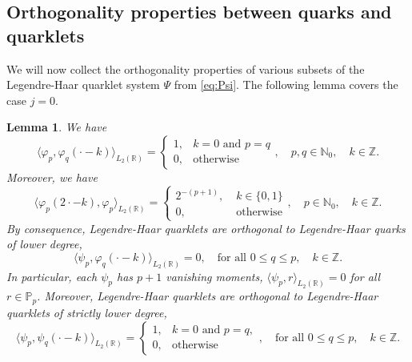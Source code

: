 \documentclass{article}
\newtheorem{lemma}[propo]{Lemma}
\begin{document}
\subsection{Orthogonality properties between quarks and quarklets}
We will now collect the orthogonality properties of various subsets of the Legendre-Haar quarklet system $\Psi$ from \eqref{eq:Psi}. The following lemma covers the case $j=0$.
\begin{lemma}\label{lemma:ortholemma1}
We have
\begin{equation}
  \label{eq:phipphiqorth}
  \big\langle\varphi_p,\varphi_q(\cdot-k)\big\rangle_{L_2(\mathds R)}=\begin{cases}
  1,&k=0\text{ and }p=q\\
  0,&\text{otherwise}
  \end{cases},\quad
  p,q\in\mathbb N_0,\quad k\in\mathbb Z.
\end{equation}
Moreover, we have
\begin{equation}
  \label{eq:phipproducts}
  \big\langle\varphi_p(2\cdot-k),\varphi_p\big\rangle_{L_2(\mathbb R)}
  =
  \begin{cases}
  2^{-(p+1)},&\;k\in\{0,1\}\\
  0,&\;\text{otherwise}
  \end{cases},
  \quad
  p\in\mathbb N_0,\quad k\in\mathbb Z.
\end{equation}
By consequence, Legendre-Haar quarklets are orthogonal to Legendre-Haar quarks of lower degree,
\begin{equation}
  \label{eq:psipphiqorth}
  \big\langle\psi_p,\varphi_q(\cdot-k)\big\rangle_{L_2(\mathbb R)}=0,
  \quad
  \text{for all } 0\le q\le p,\quad k\in\mathbb Z.
\end{equation}
In particular, each $\psi_p$ has $p+1$ vanishing moments,
$\langle\psi_p,r\rangle_{L_2(\mathbb R)}=0$ for all $r\in\mathbb P_p$.
Moreover, Legendre-Haar quarklets are orthogonal to Legendre-Haar quarklets of strictly lower degree,
\begin{equation}
  \label{eq:psippsiqorth}
  \big\langle\psi_p,\psi_q(\cdot-k)\big\rangle_{L_2(\mathbb R)}=
  \begin{cases}
  1,&k=0\text{ and }p=q,\\
  0,&\text{otherwise}
  \end{cases},\quad
  \text{for all } 0\le q\le p,\quad k\in\mathbb Z.
\end{equation}
\end{lemma}
\end{document}
